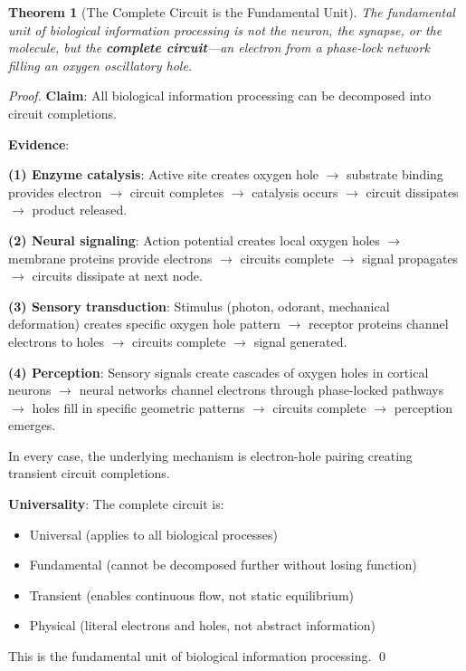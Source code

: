 \documentclass[11pt]{article}
\newtheorem{theorem}{Theorem}[section]
\theoremstyle{remark}
\begin{document}
\begin{theorem}[The Complete Circuit is the Fundamental Unit]
\label{thm:complete_circuit_unit}
The fundamental unit of biological information processing is not the neuron, the synapse, or the molecule, but the \textbf{complete circuit}—an electron from a phase-lock network filling an oxygen oscillatory hole.
\end{theorem}

\begin{proof}
\textbf{Claim}: All biological information processing can be decomposed into circuit completions.

\textbf{Evidence}:

\textbf{(1) Enzyme catalysis}: Active site creates oxygen hole $\to$ substrate binding provides electron $\to$ circuit completes $\to$ catalysis occurs $\to$ circuit dissipates $\to$ product released.

\textbf{(2) Neural signaling}: Action potential creates local oxygen holes $\to$ membrane proteins provide electrons $\to$ circuits complete $\to$ signal propagates $\to$ circuits dissipate at next node.

\textbf{(3) Sensory transduction}: Stimulus (photon, odorant, mechanical deformation) creates specific oxygen hole pattern $\to$ receptor proteins channel electrons to holes $\to$ circuits complete $\to$ signal generated.

\textbf{(4) Perception}: Sensory signals create cascades of oxygen holes in cortical neurons $\to$ neural networks channel electrons through phase-locked pathways $\to$ holes fill in specific geometric patterns $\to$ circuits complete $\to$ perception emerges.

In every case, the underlying mechanism is electron-hole pairing creating transient circuit completions.

\textbf{Universality}: The complete circuit is:
\begin{itemize}
\item Universal (applies to all biological processes)
\item Fundamental (cannot be decomposed further without losing function)
\item Transient (enables continuous flow, not static equilibrium)
\item Physical (literal electrons and holes, not abstract information)
\end{itemize}

This is the fundamental unit of biological information processing. \qed
\end{proof}
\end{document}
